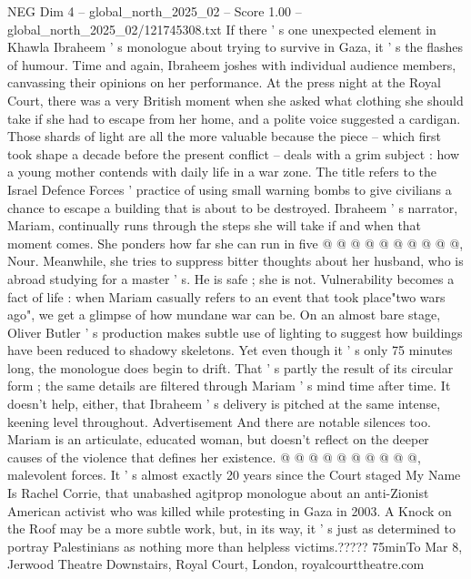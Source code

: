 \begin{textsample}{NEG Dim 4 – global\_north\_2025\_02 – Score 1.00 – global\_north\_2025\_02/121745308.txt}  \label{ex:f4_neg_405}
If there ' s one unexpected element in Khawla Ibraheem ' s monologue about trying to survive in Gaza, it ' s the flashes of humour.
Time and again, Ibraheem joshes with individual audience members, canvassing their opinions on her performance.
At the press night at the Royal Court, there was a very British moment when she asked what clothing she should take if she had to escape from her home, and a polite voice suggested a cardigan.
Those shards of light are all the more valuable because the piece -- which first took shape a decade before the present conflict -- deals with a grim subject : how a young mother contends with daily life in a war zone.
The title refers to the Israel Defence Forces ' practice of using small warning bombs to give civilians a chance to escape a building that is about to be destroyed.
Ibraheem ' s narrator, Mariam, continually runs through the steps she will take if and when that moment comes.
She ponders how far she can run in five @ @ @ @ @ @ @ @ @ @, Nour.
Meanwhile, she tries to suppress bitter thoughts about her husband, who is abroad studying for a master ' s.
He is safe ; she is not.
Vulnerability becomes a fact of life : when Mariam casually refers to an event that took place"two wars ago", we get a glimpse of how mundane war can be.
On an almost bare stage, Oliver Butler ' s production makes subtle use of lighting to suggest how buildings have been reduced to shadowy skeletons.
Yet even though it ' s only 75 minutes long, the monologue does begin to drift.
That ' s partly the result of its circular form ; the same details are filtered through Mariam ' s mind time after time.
It doesn't help, either, that Ibraheem ' s delivery is pitched at the same intense, keening level throughout.
Advertisement And there are notable silences too.
Mariam is an articulate, educated woman, but doesn't reflect on the deeper causes of the violence that defines her existence. @ @ @ @ @ @ @ @ @ @, malevolent forces.
It ' s almost exactly 20 years since the Court staged My Name Is Rachel Corrie, that unabashed agitprop monologue about an anti-Zionist American activist who was killed while protesting in Gaza in 2003.
A Knock on the Roof may be a more subtle work, but, in its way, it ' s just as determined to portray Palestinians as nothing more than helpless victims.????? 75minTo Mar 8, Jerwood Theatre Downstairs, Royal Court, London, royalcourttheatre.com

\end{textsample}
